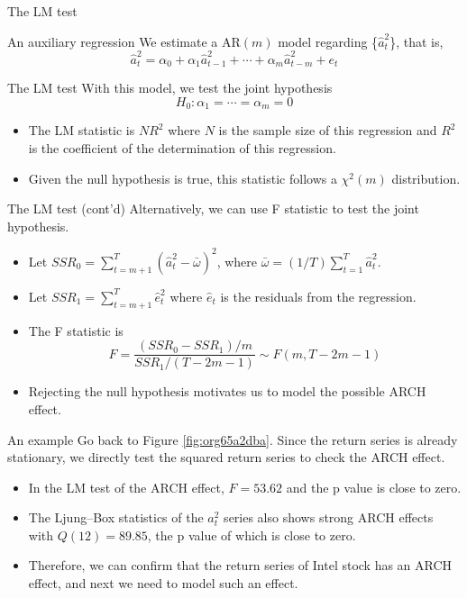 \documentclass[presentation,10pt]{beamer}
\begin{document}
\begin{frame}[label={sec:org639776e}]{The LM test}
\begin{block}{An auxiliary regression}
We estimate a AR\((m)\) model regarding \{\(\hat{a}^2_t\)\}, that is,
\[ \hat{a}^2_t = \alpha_0 + \alpha_1 \hat{a}_{t-1}^2 + \cdots +
\alpha_m \hat{a}^2_{t-m} + e_t \]
\end{block}

\begin{block}{The LM test}
With this model, we test the joint hypothesis
\[H_0: \alpha_1 = \cdots = \alpha_m = 0 \]
\begin{itemize}
\item The LM statistic is \(NR^2\) where \(N\) is the sample size of this
regression and \(R^2\) is the coefficient of the determination of this
regression.
\item Given the null hypothesis is true, this statistic follows
a \(\chi^2(m)\) distribution.
\end{itemize}
\end{block}
\end{frame}

\begin{frame}[label={sec:org538519a}]{The LM test (cont'd)}
Alternatively, we can use F statistic to test the joint
hypothesis.
\begin{itemize}
\item Let \(SSR_0 = \sum_{t=m+1}^{T} (\hat{a}^2_{t} -
  \bar{\omega})^2\), where \(\bar{\omega} = (1/T) \sum_{t=1}^T
  \hat{a}^2_t\).
\item Let \(SSR_1 = \sum_{t=m+1}^T \hat{e}^2_t\) where \(\hat{e}_t\) is the
residuals from the regression.
\item The F statistic is
\[F = \frac{(SSR_0 - SSR_1)/m}{SSR_1/(T-2m-1)} \sim F(m, T-2m-1)\]
\item Rejecting the null hypothesis motivates us to model the possible
ARCH effect.
\end{itemize}
\end{frame}

\begin{frame}[label={sec:orgfa55e75}]{An example}
Go back to Figure \ref{fig:org65a2dba}. Since the return series is
already stationary, we directly test the squared return series to
check the ARCH effect.

\begin{itemize}
\item In the LM test of the ARCH effect, \(F = 53.62\) and the p value is
close to zero.
\item The Ljung–Box statistics of the \(a^2_t\) series also
shows strong ARCH effects with \(Q(12) = 89.85\), the p value of which is
close to zero.
\item Therefore, we can confirm that the return series of
Intel stock has an ARCH effect, and next we need to model such an
effect.
\end{itemize}
\end{frame}
\end{document}
